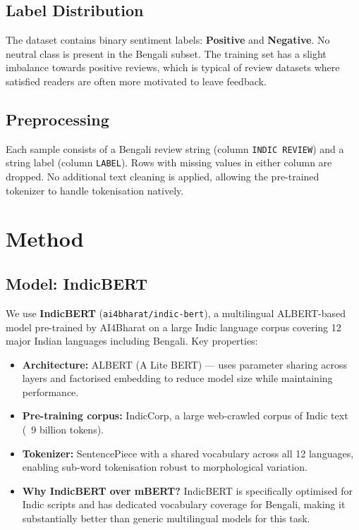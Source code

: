 \documentclass[11pt,a4paper]{article}
\begin{document}
\subsection{Label Distribution}

The dataset contains binary sentiment labels: \textbf{Positive} and \textbf{Negative}. No neutral class is present in the Bengali subset. The training set has a slight imbalance towards positive reviews, which is typical of review datasets where satisfied readers are often more motivated to leave feedback.

\subsection{Preprocessing}

Each sample consists of a Bengali review string (column \texttt{INDIC REVIEW}) and a string label (column \texttt{LABEL}). Rows with missing values in either column are dropped. No additional text cleaning is applied, allowing the pre-trained tokenizer to handle tokenisation natively.

\section{Method}

\subsection{Model: IndicBERT}

We use \textbf{IndicBERT} (\texttt{ai4bharat/indic-bert}), a multilingual ALBERT-based model pre-trained by AI4Bharat on a large Indic language corpus covering 12 major Indian languages including Bengali. Key properties:

\begin{itemize}[noitemsep]
    \item \textbf{Architecture:} ALBERT (A Lite BERT) — uses parameter sharing across layers and factorised embedding to reduce model size while maintaining performance.
    \item \textbf{Pre-training corpus:} IndicCorp, a large web-crawled corpus of Indic text (~9 billion tokens).
    \item \textbf{Tokenizer:} SentencePiece with a shared vocabulary across all 12 languages, enabling sub-word tokenisation robust to morphological variation.
    \item \textbf{Why IndicBERT over mBERT?} IndicBERT is specifically optimised for Indic scripts and has dedicated vocabulary coverage for Bengali, making it substantially better than generic multilingual models for this task.
\end{itemize}
\end{document}
